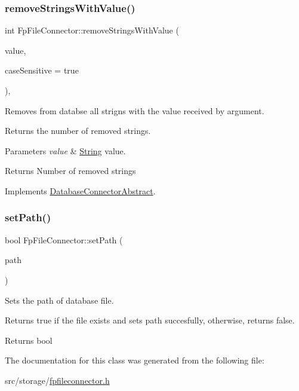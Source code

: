 \subsubsection{\texorpdfstring{remove\+Strings\+With\+Value()}{removeStringsWithValue()}}
{\footnotesize\ttfamily int Fp\+File\+Connector\+::remove\+Strings\+With\+Value (\begin{DoxyParamCaption}\item[{const Q\+String \&}]{value,  }\item[{bool}]{case\+Sensitive = {\ttfamily true} }\end{DoxyParamCaption})\hspace{0.3cm}{\ttfamily [override]}, {\ttfamily [virtual]}}



Removes from databse all strigns with the value received by argument. 

Returns the number of removed strings. 
\begin{DoxyParams}{Parameters}
{\em value} & \mbox{\hyperlink{classString}{String}} value. \\
\hline
\end{DoxyParams}
\begin{DoxyReturn}{Returns}
Number of removed strings 
\end{DoxyReturn}


Implements \mbox{\hyperlink{classDatabaseConnectorAbstract_af482c0b4af4488c5897c04d0c4dff906}{Database\+Connector\+Abstract}}.

\mbox{\label{classFpFileConnector_a7a5c2987feae762ce359de702f5702e3}} 
\subsubsection{\texorpdfstring{set\+Path()}{setPath()}}
{\footnotesize\ttfamily bool Fp\+File\+Connector\+::set\+Path (\begin{DoxyParamCaption}\item[{const Q\+String \&}]{path }\end{DoxyParamCaption})}



Sets the path of database file. 

Returns true if the file exists and sets path succesfully, otherwise, returns false. \begin{DoxyReturn}{Returns}
bool 
\end{DoxyReturn}


The documentation for this class was generated from the following file\+:\begin{DoxyCompactItemize}
\item 
src/storage/\mbox{\hyperlink{fpfileconnector_8h}{fpfileconnector.\+h}}\end{DoxyCompactItemize}

